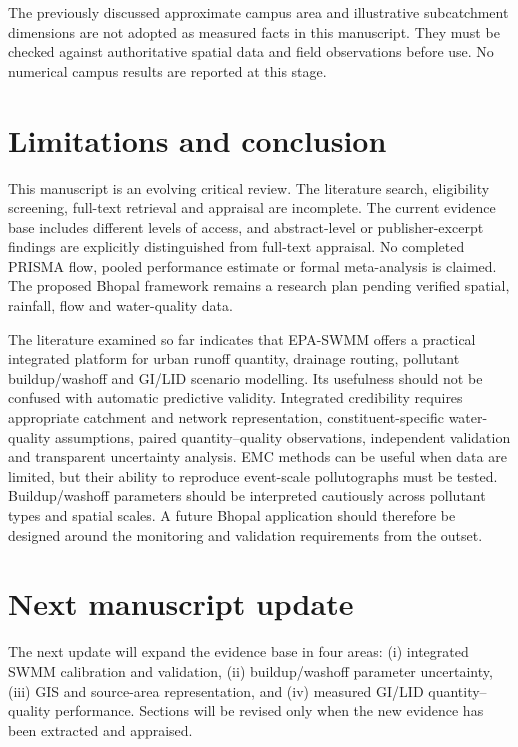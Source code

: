 \documentclass[journal]{IEEEtran}
\begin{document}
The previously discussed approximate campus area and illustrative subcatchment dimensions are not adopted as measured facts in this manuscript. They must be checked against authoritative spatial data and field observations before use. No numerical campus results are reported at this stage.

\section{Limitations and conclusion}
This manuscript is an evolving critical review. The literature search, eligibility screening, full-text retrieval and appraisal are incomplete. The current evidence base includes different levels of access, and abstract-level or publisher-excerpt findings are explicitly distinguished from full-text appraisal. No completed PRISMA flow, pooled performance estimate or formal meta-analysis is claimed. The proposed Bhopal framework remains a research plan pending verified spatial, rainfall, flow and water-quality data.

The literature examined so far indicates that EPA-SWMM offers a practical integrated platform for urban runoff quantity, drainage routing, pollutant buildup/washoff and GI/LID scenario modelling. Its usefulness should not be confused with automatic predictive validity. Integrated credibility requires appropriate catchment and network representation, constituent-specific water-quality assumptions, paired quantity--quality observations, independent validation and transparent uncertainty analysis. EMC methods can be useful when data are limited, but their ability to reproduce event-scale pollutographs must be tested. Buildup/washoff parameters should be interpreted cautiously across pollutant types and spatial scales. A future Bhopal application should therefore be designed around the monitoring and validation requirements from the outset.

\section*{Next manuscript update}
The next update will expand the evidence base in four areas: (i) integrated SWMM calibration and validation, (ii) buildup/washoff parameter uncertainty, (iii) GIS and source-area representation, and (iv) measured GI/LID quantity--quality performance. Sections will be revised only when the new evidence has been extracted and appraised.
\end{document}
